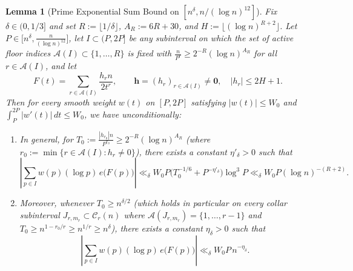 \documentclass[11pt,reqno]{amsart}
\newtheorem{lemma}[theorem]{Lemma}
\theoremstyle{remark}
\numberwithin{equation}{section}
\begin{document}
\begin{lemma}[{Prime Exponential Sum Bound on {$[n^\delta, n/(\log n)^{12}]$}}]\label{lem:2.4}
Fix $\delta \in (0, 1/3]$ and set $R := \lfloor 1/\delta \rfloor$, $A_R := 6R + 30$, and $H := \lfloor (\log n)^{R+2} \rfloor$. Let $P \in \bigl[n^\delta, \frac{n}{(\log n)^{12}}\bigr]$, let $I \subset (P, 2P]$ be any subinterval on which the set of active floor indices $\mathcal{A}(I) \subset \{1, \dots, R\}$ is fixed with $\frac{n}{P^r} \ge 2^{-R}(\log n)^{A_R}$ for all $r \in \mathcal{A}(I)$, and let
\[
F(t) = \sum_{r \in \mathcal{A}(I)} \frac{h_r n}{2t^r}, \qquad \mathbf{h} = (h_r)_{r \in \mathcal{A}(I)} \ne \mathbf{0}, \quad |h_r| \le 2H + 1.
\]
Then for every smooth weight $w(t)$ on $[P, 2P]$ satisfying $|w(t)| \le W_0$ and $\int_P^{2P} |w'(t)|\,dt \le W_0$, we have unconditionally:
\begin{enumerate}
\item[(i)] In general, for $T_0 := \frac{|h_{r_0}|n}{P^{r_0}} \ge 2^{-R}(\log n)^{A_R}$ (where $r_0 := \min\{r \in \mathcal{A}(I) : h_r \ne 0\}$), there exists a constant $\eta'_\delta > 0$ such that
\begin{equation}\label{eq:2.13}
\left|\sum_{p \in I} w(p)(\log p)\,e\bigl(F(p)\bigr)\right| \ll_\delta W_0 P\bigl(T_0^{-1/6} + P^{-\eta'_\delta}\bigr)\log^3 P \ll_\delta W_0 P(\log n)^{-(R+2)}.
\end{equation}
\item[(ii)] Moreover, whenever $T_0 \ge n^{\delta/2}$ (which holds in particular on every collar subinterval $J_{r,m_r} \subset \mathcal{C}_r(n)$ where $\mathcal{A}(J_{r,m_r}) = \{1, \dots, r - 1\}$ and $T_0 \ge n^{1-r_0/r} \ge n^{1/r} \ge n^\delta$), there exists a constant $\eta_\delta > 0$ such that
\begin{equation}\label{eq:2.14}
\left|\sum_{p \in I} w(p)(\log p)\,e\bigl(F(p)\bigr)\right| \ll_\delta W_0 P\,n^{-\eta_\delta}.
\end{equation}
\end{enumerate}
\end{lemma}
\end{document}
